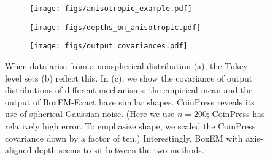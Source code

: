 \begin{figure}[h!]
    \centering
    \begin{subfigure}[t]{0.48\columnwidth}
        \centering
        \texttt{[image: figs/anisotropic\_example.pdf]} %
        \caption{}
        \label{fig:top-left}
    \end{subfigure}
    \hfill
    \begin{subfigure}[t]{0.48\columnwidth}
        \centering
        \texttt{[image: figs/depths\_on\_anisotropic.pdf]} %
        \caption{}
        \label{fig:top-right}
    \end{subfigure}

    \vspace{1em} %
    \begin{subfigure}[t]{0.8\columnwidth}
        \centering
        \texttt{[image: figs/output\_covariances.pdf]} %
        \caption{}
        \label{fig:bottom}
    \end{subfigure}

    \caption{When data arise from a nonspherical distribution (a), the Tukey level sets (b) reflect this. In (c), we show the covariance of output distributions of different mechanisms: the empirical mean and the output of BoxEM-Exact have similar shapes. CoinPress reveals its use of spherical Gaussian noise. 
    (Here we use $n=200$;  CoinPress has relatively high error. To emphasize shape, we scaled the CoinPress covariance  down by a factor of ten.)
    Interestingly, BoxEM with axis-aligned depth seems to sit between the two methods.}
    \label{fig:main-figure}
\end{figure}